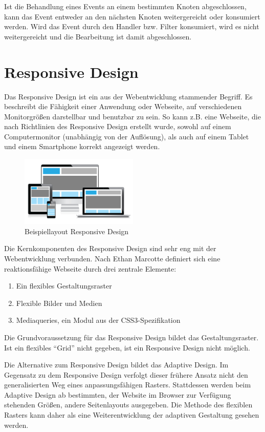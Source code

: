 Ist die Behandlung eines Events an einem bestimmten Knoten abgeschlossen, kann das Event entweder an den nächsten Knoten weitergereicht oder konsumiert werden. Wird das Event durch den Handler bzw. Filter konsumiert, wird es nicht weitergereicht und die Bearbeitung ist damit abgeschlossen.\par
\section{Responsive Design}
Das Responsive Design ist ein aus der Webentwicklung stammender Begriff. Es beschreibt die Fähigkeit einer Anwendung oder Webseite, auf verschiedenen Monitorgrößen darstellbar und benutzbar zu sein. So kann z.B. eine Webseite, die nach Richtlinien des Responsive Design erstellt wurde, sowohl auf einem Computermonitor (unabhängig von der Auflösung), als auch auf einem Tablet und einem Smartphone korrekt angezeigt werden.\par
\begin{figure}[H]
 \centering
 \includegraphics[width=0.5\textwidth]{grafiken/responsive_design.png}
 \caption{Beispiellayout Responsive Design \cite{Moon2013}}
 \label{fig:responsiveDesign}
\end{figure}
Die Kernkomponenten des Responsive Design sind sehr eng mit der Webentwicklung verbunden. Nach Ethan Marcotte definiert sich eine reaktionsfähige Webseite durch drei zentrale Elemente:
\begin{enumerate}
 \item Ein flexibles Gestaltungsraster
 \item Flexible Bilder und Medien
 \item Mediaqueries, ein Modul aus der CSS3-Spezifikation \cite[S. 15]{Zillgens2012}
\end{enumerate}
Die Grundvoraussetzung für das Responsive Design bildet das Gestaltungsraster. Ist ein flexibles \enquote{Grid} nicht gegeben, ist ein Responsive Design nicht möglich.\cite{Zillgens2012}\par
Die Alternative zum Responsive Design bildet das Adaptive Design. Im Gegensatz zu dem Responsive Design verfolgt dieser frühere Ansatz nicht den generalisierten Weg eines anpassungsfähigen Rasters. Stattdessen werden beim Adaptive Design ab bestimmten, der Website im Browser zur Verfügung stehenden Größen, andere Seitenlayouts ausgegeben. Die Methode des flexiblen Rasters kann daher als eine Weiterentwicklung der adaptiven Gestaltung gesehen werden.\cite[S. 14]{Zillgens2012}\par

